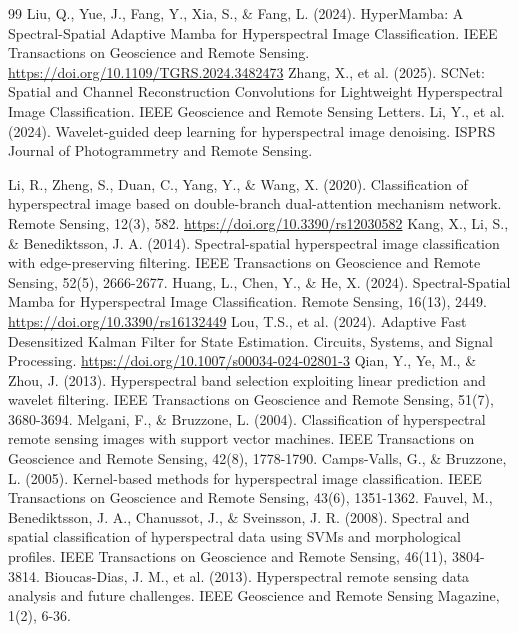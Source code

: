 \documentclass[pdflatex,sn-mathphys-num,iicol]{sn-jnl}
\begin{document}
\begin{thebibliography}{99}
 Liu, Q., Yue, J., Fang, Y., Xia, S., \& Fang, L. (2024). HyperMamba: A Spectral-Spatial Adaptive Mamba for Hyperspectral Image Classification. IEEE Transactions on Geoscience and Remote Sensing. \url{https://doi.org/10.1109/TGRS.2024.3482473}
 Zhang, X., et al. (2025). SCNet: Spatial and Channel Reconstruction Convolutions for Lightweight Hyperspectral Image Classification. IEEE Geoscience and Remote Sensing Letters.
 Li, Y., et al. (2024). Wavelet-guided deep learning for hyperspectral image denoising. ISPRS Journal of Photogrammetry and Remote Sensing.

 Li, R., Zheng, S., Duan, C., Yang, Y., \& Wang, X. (2020). Classification of hyperspectral image based on double-branch dual-attention mechanism network. Remote Sensing, 12(3), 582. \url{https://doi.org/10.3390/rs12030582}
 Kang, X., Li, S., \& Benediktsson, J. A. (2014). Spectral-spatial hyperspectral image classification with edge-preserving filtering. IEEE Transactions on Geoscience and Remote Sensing, 52(5), 2666-2677.
 Huang, L., Chen, Y., \& He, X. (2024). Spectral-Spatial Mamba for Hyperspectral Image Classification. Remote Sensing, 16(13), 2449. \url{https://doi.org/10.3390/rs16132449}
 Lou, T.S., et al. (2024). Adaptive Fast Desensitized Kalman Filter for State Estimation. Circuits, Systems, and Signal Processing. \url{https://doi.org/10.1007/s00034-024-02801-3}
 Qian, Y., Ye, M., \& Zhou, J. (2013). Hyperspectral band selection exploiting linear prediction and wavelet filtering. IEEE Transactions on Geoscience and Remote Sensing, 51(7), 3680-3694.
 Melgani, F., \& Bruzzone, L. (2004). Classification of hyperspectral remote sensing images with support vector machines. IEEE Transactions on Geoscience and Remote Sensing, 42(8), 1778-1790.
 Camps-Valls, G., \& Bruzzone, L. (2005). Kernel-based methods for hyperspectral image classification. IEEE Transactions on Geoscience and Remote Sensing, 43(6), 1351-1362.
 Fauvel, M., Benediktsson, J. A., Chanussot, J., \& Sveinsson, J. R. (2008). Spectral and spatial classification of hyperspectral data using SVMs and morphological profiles. IEEE Transactions on Geoscience and Remote Sensing, 46(11), 3804-3814.
 Bioucas-Dias, J. M., et al. (2013). Hyperspectral remote sensing data analysis and future challenges. IEEE Geoscience and Remote Sensing Magazine, 1(2), 6-36.

\end{thebibliography}
\end{document}
